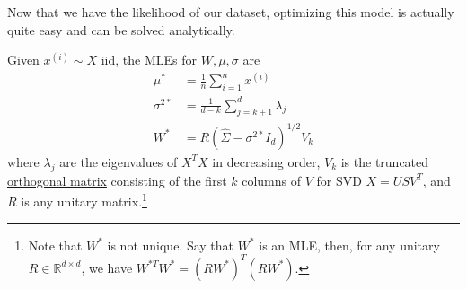   Now that we have the likelihood of our dataset, optimizing this model is actually quite easy and can be solved analytically. 

  \begin{corollary}
    \label{thm:mle-of-ppca-model}
    Given $x^{(i)} \sim X$ iid, the MLEs for $W, \mu, \sigma$ are 
    \begin{align}
      \mu^\ast & = \frac{1}{n} \sum_{i=1}^n x^{(i)} \\
      \sigma^{2 \ast} & = \frac{1}{d-k} \sum_{j=k+1}^d \lambda_j \\
      W^\ast & = R (\hat{\Sigma} - \sigma^{2 \ast} I_d )^{1/2} V_k
    \end{align}
    where $\lambda_j$ are the eigenvalues of $X^T X$ in decreasing order, $V_k$ is the truncated \hyperref[lin-def:orthogonal-matrix]{orthogonal matrix} consisting of the first $k$ columns of $V$ for SVD $X = U S V^T$, and $R$ is any unitary matrix.\footnote{Note that $W^{\ast}$ is not unique. Say that $W^\ast$ is an MLE, then, for any unitary $R \in \mathbb{R}^{d \times d}$, we have $W^{\ast T} W^\ast = (R W^\ast)^T (R W^\ast)$.} 
  \end{corollary}
